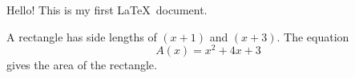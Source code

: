 \documentclass[11pt]{article}
\begin{document}
Hello! This is my first \LaTeX\ document.

A rectangle has side lengths of $(x+1)$ and $(x+3)$.
The equation $$A(x)=x^2+4x+3$$ gives the area of the rectangle.
\end{document}
